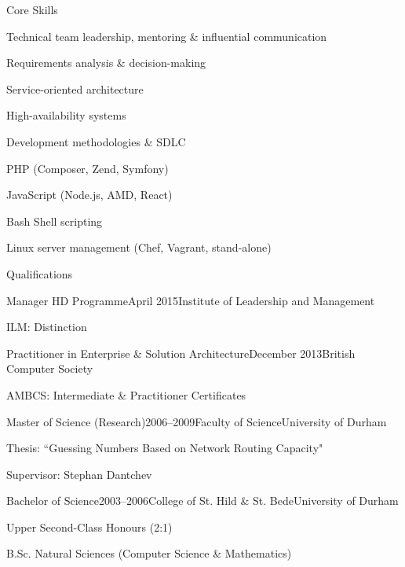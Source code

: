 \documentclass{cv}
\begin{document}

\begin{rSection}{Core Skills}

\begin{rSubsection}{}{}{}{}
\item Technical team leadership, mentoring \& influential communication
\item Requirements analysis \& decision-making
\item Service-oriented architecture
\item High-availability systems
\item Development methodologies \& SDLC
\item PHP (Composer, Zend, Symfony)
\item JavaScript (Node.js, AMD, React)
\item Bash Shell scripting
\item Linux server management (Chef, Vagrant, stand-alone)
\end{rSubsection}

\end{rSection}


\begin{rSection}{Qualifications}

\begin{rSubsection}{Manager HD Programme}{April 2015}{Institute of Leadership and Management}{}
\item ILM: Distinction
\end{rSubsection}

\begin{rSubsection}{Practitioner in Enterprise \& Solution Architecture}{December 2013}{British Computer Society}{}
\item AMBCS: Intermediate \& Practitioner Certificates
\end{rSubsection}

\begin{rSubsection}{Master of Science (Research)}{2006--2009}{Faculty of Science}{University of Durham}
\item Thesis: ``Guessing Numbers Based on Network Routing Capacity"
\item Supervisor: Stephan Dantchev
\end{rSubsection}

\begin{rSubsection}{Bachelor of Science}{2003--2006}{College of St. Hild \& St. Bede}{University of Durham}
\item Upper Second-Class Honours (2:1)
\item B.Sc. Natural Sciences (Computer Science \& Mathematics)
\end{rSubsection}

\end{rSection}
\end{document}
